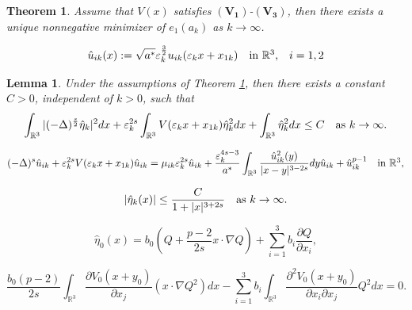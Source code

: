 \documentclass[10pt,a4paper]{amsart}
\newtheorem{theorem}{Theorem}
\newtheorem{lemma}{Lemma}
\begin{document}
	\begin{theorem}\label{the3}
		Assume that $V(x)$ satisfies $\mathbf{(V_1)}$-$\mathbf{(V_3)}$, then there exists a unique nonnegative minimizer of $e_{1}(a_{k})$ as $k\rightarrow\infty$.
	\end{theorem}

	\begin{equation}\label{equ4-4}
		\hat{u}_{ik}(x):=\sqrt{a^{\ast}}\varepsilon^{\frac{3}{2}}_{k}u_{ik}(\varepsilon_{k}x+x_{1k})\quad \hbox{in $\mathbb{R}^{3}$,\quad $i=1, 2$}
	\end{equation}

	\begin{lemma}\label{lem4-1}
		Under the assumptions of Theorem \ref{the3}, then there exists a constant $C>0$, independent
		of $k>0$, such that
		\begin{equation}\label{equ4-6}
			\int_{\mathbb{R}^{3}}|(-\Delta)^{\frac{s}{2}}\hat{\eta}_{k}|^{2}dx+\varepsilon_{k}^{2s}\int_{\mathbb{R}^{3}}V(\varepsilon_{k}x+x_{1k})\hat{\eta}_{k}^{2}dx+\int_{\mathbb{R}^{3}}\hat{\eta}_{k}^{2}dx\leq C\quad \hbox{as $k\rightarrow\infty$}.
		\end{equation}
	\end{lemma}

		\begin{equation}\label{equ4-7}
			(-\Delta)^{s} \hat{u}_{ik}+\varepsilon_{k}^{2s}V(\varepsilon_{k}x+x_{1k})\hat{u}_{ik}=\mu_{ik}\varepsilon_{k}^{2s}\hat{u}_{ik}+\frac{\varepsilon_{k}^{4s-3}}{a^{\ast}}\int_{\mathbb{R}^{3}}\frac{\hat{u}_{ik}^{2}(y)}{|x-y|^{3-2s}}dy\hat{u}_{ik}+\hat{u}_{ik}^{p-1}\quad \hbox{in $\mathbb{R}^{3}$},
		\end{equation}

		\begin{equation}\label{equ4-16}
			|\hat{\eta}_{k}(x)|\leq\frac{C}{1+|x|^{3+2s}}\quad \hbox{as $k\rightarrow\infty$}.
		\end{equation}

	\begin{equation}\label{equ4-22}
		\hat{\eta}_{0}(x)=b_{0}\left(Q+\frac{p-2}{2s}x\cdot\nabla Q\right)+\sum_{i=1}^{3}b_{i}\frac{\partial Q}{\partial x_{i}},
	\end{equation}

		\begin{equation}\label{equ4-23}
			\frac{b_{0}(p-2)}{2s}\int_{\mathbb{R}^{3}}\frac{\partial V_{0}(x+y_{0})}{\partial x_{j}}(x\cdot\nabla Q^{2})dx-\sum^{3}_{i=1}
			b_{i}\int_{\mathbb{R}^{3}}\frac{\partial^{2}V_{0}(x+y_{0})}{\partial x_{i}\partial x_{j}}Q^{2}dx=0.
		\end{equation}
\end{document}
